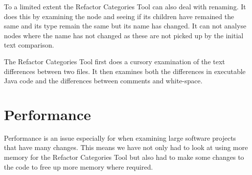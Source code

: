 To a limited extent the Refactor Categories Tool can also deal with renaming. It does this by examining the node and seeing if its children have remained the same and its type remain the same but its name has changed. It can not analyse nodes where the name has not changed as these are not picked up by the initial text comparison.

The Refactor Categories Tool first does a cursory examination of the text differences between two files. It then examines both the differences in executable Java code and the differences between comments and white-space. 



\section{Performance}
Performance is an issue especially for when examining large software projects that have many changes. This means we have not only had to look at using more memory for the Refactor Categories Tool but also had to make some changes to the code to free up more memory where required.

